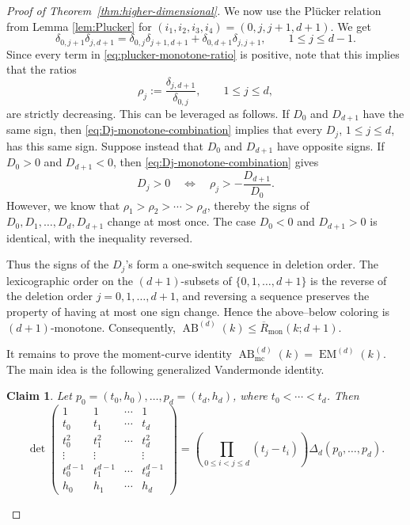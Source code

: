 \documentclass[11pt]{article}
\newtheorem{claim}[theorem]{Claim}
\begin{document}
\begin{proof}[Proof of Theorem~\ref{thm:higher-dimensional}]
We now use the Pl\"ucker relation from Lemma \ref{lem:Plucker} for $(i_1,i_2,i_3,i_4)=(0,j,j+1,d+1)$. We get
\begin{equation}\label{eq:plucker-monotone-ratio}
\delta_{0,j+1}\delta_{j,d+1}
=
\delta_{0,j}\delta_{j+1,d+1}
+
\delta_{0,d+1}\delta_{j,j+1},
\qquad 1\le j\le d-1.
\end{equation}
Since every term in \eqref{eq:plucker-monotone-ratio} is positive, note that this implies that the ratios
\[
\rho_j:=\frac{\delta_{j,d+1}}{\delta_{0,j}},
\qquad 1\le j\le d,
\]
are strictly decreasing. This can be leveraged as follows. If $D_0$ and $D_{d+1}$ have the same sign, then
\eqref{eq:Dj-monotone-combination} implies that every $D_j$, $1\le j\le d$,
has this same sign. Suppose instead that $D_0$ and $D_{d+1}$ have opposite
signs. If $D_0>0$ and $D_{d+1}<0$, then
\eqref{eq:Dj-monotone-combination} gives
\[
D_j>0
\quad\Longleftrightarrow\quad
\rho_j>-\frac{D_{d+1}}{D_0}.
\]
However, we know that $\rho_1>\rho_2>\cdots>\rho_d$, thereby the signs of $D_0,D_1,\ldots,D_d,D_{d+1}$ change at most once. The case $D_0<0$ and $D_{d+1}>0$ is identical, with the
inequality reversed.

Thus the signs of the $D_j$'s form a one-switch sequence in deletion order.
The lexicographic order on the $(d+1)$-subsets of
$\{0,1,\ldots,d+1\}$ is the reverse of the deletion order
$j=0,1,\ldots,d+1$, and reversing a sequence preserves the property of having
at most one sign change. Hence the above--below coloring is
$(d+1)$-monotone. Consequently, $\operatorname{AB}^{(d)}(k)\le \overline R_{\mathrm{mon}}(k;d+1)$.

It remains to prove the moment-curve identity $\operatorname{AB}^{(d)}_{\mathrm{mc}}(k)=\operatorname{EM}^{(d)}(k)$. The main idea is the following generalized Vandermonde identity.

\begin{claim}\label{claim:vandermonde-divdiff}
Let $p_0=(t_0,h_0),\dots,p_d=(t_d,h_d)$, where $t_0<\cdots<t_d$. Then
\[
\det
\begin{pmatrix}
1&1&\cdots&1\\
t_0&t_1&\cdots&t_d\\
t_0^2&t_1^2&\cdots&t_d^2\\
\vdots&\vdots&&\vdots\\
t_0^{d-1}&t_1^{d-1}&\cdots&t_d^{d-1}\\
h_0&h_1&\cdots&h_d
\end{pmatrix}
=
\left(\prod_{0\le i<j\le d}(t_j-t_i)\right)
\Delta_d(p_0,\dots,p_d).
\]
\end{claim}


\end{proof}
\end{document}
